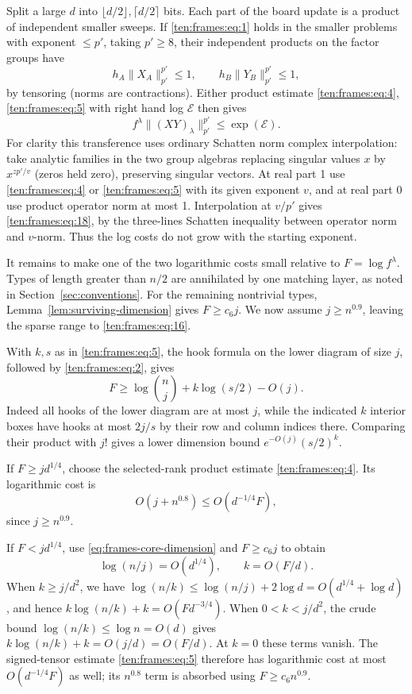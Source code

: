 Split a large \(d\) into \(\lfloor d/2\rfloor,\lceil d/2\rceil\) bits. Each part of the board update is a product of independent smaller sweeps. If \eqref{ten:frames:eq:1} holds in the smaller problems with exponent \(\le p'\), taking \(p'\ge8\), their independent products on the factor groups have
\[
 h_A\|X_A\|_{p'}^{p'}\le1,\qquad h_B\|Y_B\|_{p'}^{p'}\le1,
\]
by tensoring (norms are contractions). Either product estimate \eqref{ten:frames:eq:4}, \eqref{ten:frames:eq:5} with right hand log \(\mathcal E\) then gives
\begin{equation}
 f^\lambda\|(XY)_\lambda\|_{p'}^{p'} \le \exp(\mathcal E).
 \label{ten:frames:eq:18}
\end{equation}
For clarity this transference uses ordinary Schatten norm complex interpolation: take analytic families in the two group algebras replacing singular values \(x\) by \(x^{z p'/v}\) (zeros held zero), preserving singular vectors. At real part 1 use \eqref{ten:frames:eq:4} or \eqref{ten:frames:eq:5} with its given exponent \(v\), and at real part 0 use product operator norm at most 1. Interpolation at \(v/p'\) gives \eqref{ten:frames:eq:18}, by the three-lines Schatten inequality between operator norm and \(v\)-norm. Thus the log costs do not grow with the starting exponent.

It remains to make one of the two logarithmic costs small relative to $F=\log f^\lambda$. Types of length greater than $n/2$ are annihilated by one matching layer, as noted in Section~\ref{sec:conventions}. For the remaining nontrivial types, Lemma~\ref{lem:surviving-dimension} gives $F\ge c_6j$. We now assume $j\ge n^{0.9}$, leaving the sparse range to \eqref{ten:frames:eq:16}.

With $k,s$ as in \eqref{ten:frames:eq:5}, the hook formula on the lower diagram of size $j$, followed by \eqref{ten:frames:eq:2}, gives
\begin{equation}\label{eq:frames-core-dimension}
 F\ge\log\binom nj+k\log(s/2)-O(j).
\end{equation}
Indeed all hooks of the lower diagram are at most $j$, while the indicated $k$ interior boxes have hooks at most $2j/s$ by their row and column indices there. Comparing their product with $j!$ gives a lower dimension bound $e^{-O(j)}(s/2)^k$.

If $F\ge j d^{1/4}$, choose the selected-rank product estimate \eqref{ten:frames:eq:4}. Its logarithmic cost is
\[
 O(j+n^{0.8})\le O(d^{-1/4}F),
\]
since $j\ge n^{0.9}$.

If $F<j d^{1/4}$, use \eqref{eq:frames-core-dimension} and $F\ge c_6j$ to obtain
\[
 \log(n/j)=O(d^{1/4}),\qquad k=O(F/d).
\]
When $k\ge j/d^2$, we have $\log(n/k)\le\log(n/j)+2\log d=O(d^{1/4}+\log d)$, and hence $k\log(n/k)+k=O(Fd^{-3/4})$. When $0<k<j/d^2$, the crude bound $\log(n/k)\le\log n=O(d)$ gives $k\log(n/k)+k=O(j/d)=O(F/d)$. At $k=0$ these terms vanish. The signed-tensor estimate \eqref{ten:frames:eq:5} therefore has logarithmic cost at most $O(d^{-1/4}F)$ as well; its $n^{0.8}$ term is absorbed using $F\ge c_6n^{0.9}$.

